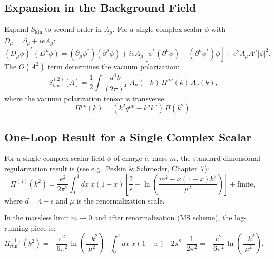 \documentclass[11pt,a4paper]{article}
\theoremstyle{remark}
\begin{document}
\subsection{Expansion in the Background Field}

Expand $S_{\mathrm{kin}}$ to second order in $A_\mu$. For a single complex scalar $\phi$
with $D_\mu = \partial_\mu + ie A_\mu$:
\begin{equation}
  (D_\mu \phi)^*(D^\mu \phi)
  = (\partial_\mu \phi^*)(\partial^\mu \phi)
    + ie A_\mu[\phi^*(\partial^\mu \phi) - (\partial^\mu \phi^*)\phi]
    + e^2 A_\mu A^\mu |\phi|^2.
  \label{eq:Dmu_expand}
\end{equation}
The $O(A^2)$ term determines the vacuum polarization:
\begin{equation}
  S_{\mathrm{kin}}^{(2)}[A]
  = \frac{1}{2}\int \frac{d^4k}{(2\pi)^4}\;A_\mu(-k)\,\Pi^{\mu\nu}(k)\,A_\nu(k),
  \label{eq:S2_def}
\end{equation}
where the vacuum polarization tensor is transverse:
\begin{equation}
  \Pi^{\mu\nu}(k) = (k^2 g^{\mu\nu} - k^\mu k^\nu)\,\Pi(k^2).
  \label{eq:Pimunu_transverse}
\end{equation}

\subsection{One-Loop Result for a Single Complex Scalar}

For a single complex scalar field $\phi$ of charge $e$, mass $m$, the standard dimensional
regularization result is (see e.g.\ Peskin \& Schroeder, Chapter~7):
\begin{equation}
  \Pi^{(1)}(k^2)
  = \frac{e^2}{2\pi^2}\int_0^1 dx\; x(1-x)
    \left[\frac{2}{\epsilon} - \ln\!\left(\frac{m^2 - x(1-x)k^2}{\mu^2}\right)\right]
  + \text{finite},
  \label{eq:Pi_scalar_exact}
\end{equation}
where $d = 4 - \epsilon$ and $\mu$ is the renormalization scale.

In the massless limit $m \to 0$ and after renormalization (MS scheme), the log-running piece is:
\begin{equation}
  \Pi^{(1)}_{\mathrm{run}}(k^2)
  = -\frac{e^2}{6\pi^2}\,\ln\!\left(\frac{-k^2}{\mu^2}\right)\cdot\int_0^1 dx\;x(1-x)
  \;\cdot 2\pi^2 \cdot \frac{1}{2\pi^2}
  = -\frac{e^2}{6\pi^2}\,\ln\!\left(\frac{-k^2}{\mu^2}\right).
  \label{eq:Pi_scalar_run}
\end{equation}
\end{document}
